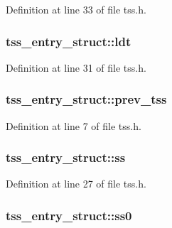 Definition at line 33 of file tss.h.

\hypertarget{structtss__entry__struct_a0ef2fa853813ea9f507c2ae92de3ab59}{
\subsubsection[{ldt}]{ {\bf tss\_\-entry\_\-struct::ldt}}}
\label{structtss__entry__struct_a0ef2fa853813ea9f507c2ae92de3ab59}


Definition at line 31 of file tss.h.

\hypertarget{structtss__entry__struct_a3d76ec9b8a326367d5c988609068e781}{
\subsubsection[{prev\_\-tss}]{ {\bf tss\_\-entry\_\-struct::prev\_\-tss}}}
\label{structtss__entry__struct_a3d76ec9b8a326367d5c988609068e781}


Definition at line 7 of file tss.h.

\hypertarget{structtss__entry__struct_a4e0e324b844755c69861f04e918f15db}{
\subsubsection[{ss}]{ {\bf tss\_\-entry\_\-struct::ss}}}
\label{structtss__entry__struct_a4e0e324b844755c69861f04e918f15db}


Definition at line 27 of file tss.h.

\hypertarget{structtss__entry__struct_a3aaba70789b616330d717224fe1e3166}{
\subsubsection[{ss0}]{ {\bf tss\_\-entry\_\-struct::ss0}}}
\label{structtss__entry__struct_a3aaba70789b616330d717224fe1e3166}


